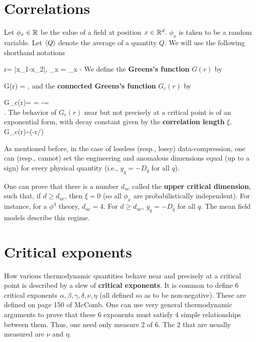 \section{Correlations}
\label{sec-corr}

Let
 $\phi_x\in { \mathbb{R}}$
be the value of a field
at position $x\in { \mathbb{R}}^d$.
 $\phi_x$
is taken to be a random variable.
Let
$\left\langle Q\right\rangle$
denote the average of a
quantity $Q$. We will use the
following shorthand notations

\beq
r= |x_1-x_2|,\;\;
\Delta\phi_x = \phi_x - 
\eeq
We define the {\bf Greens's function} $G(r)$
by

\beq
G(r) = 
\;,
\eeq
and the \textbf{connected Greens's function}
 $G_c(r)$ by

\beq
G_c(r)=
=
-=
\\
\;.
\eeq
The behavior of $G_c(r)$ near but not precisely
at a critical point is of an
exponential form, with decay
constant given by the {\bf correlation length} $\xi$.
\beq
G_c(r)\sim \exp(-r/\xi)
\eeq



As mentioned before, in the
case of lossless (resp., lossy)
data-compression, one can (resp., cannot)
set the engineering and anomalous dimensions
 equal (up to a sign) for every
physical quantity (i.e.,
$y_q=-D_q$ for all $q$).

One can prove that there is
a number $d_{uc}$ called
the \textbf{upper critical dimension},
such that, if $d\geq d_{uc}$, then  $\xi=0$ (so all $\phi_x$
are probabilistically independent).
For instance, for a $\phi^4$
theory, $d_{uc}=4$. For $d\geq d_{uc}$,
 $y_q=-D_q$ for all $q$.
The mean field
models describe this regime.

\section{Critical exponents}
How various thermodynamic
quantities behave near and precisely
at a critical point is described
by a slew of
{\bf critical exponents}.
It is common to define
6 critical exponents $\alpha, \beta,
\gamma, \delta,\nu ,\eta$ (all defined
so as to be non-negative). These are
defined on page 150 of McComb.
One
can use very general
thermodynamic arguments to prove
that these 6 exponents must satisfy
4 simple relationships
between them. Thus,
one need only measure 2 of
6. The 2 that are usually measured
are
$\nu$ and $\eta$.

